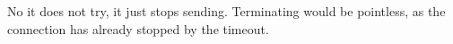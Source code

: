 No it does not try, it just stops sending. Terminating would be pointless, as the connection has already stopped by the timeout.